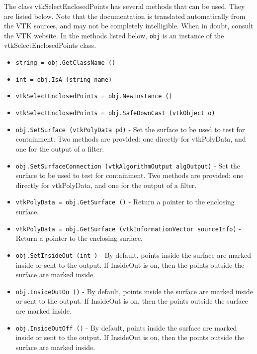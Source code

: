 The class vtkSelectEnclosedPoints has several methods that can be used.
  They are listed below.
Note that the documentation is translated automatically from the VTK sources,
and may not be completely intelligible.  When in doubt, consult the VTK website.
In the methods listed below, \verb|obj| is an instance of the vtkSelectEnclosedPoints class.
\begin{itemize}
\item  \verb|string = obj.GetClassName ()|

\item  \verb|int = obj.IsA (string name)|

\item  \verb|vtkSelectEnclosedPoints = obj.NewInstance ()|

\item  \verb|vtkSelectEnclosedPoints = obj.SafeDownCast (vtkObject o)|

\item  \verb|obj.SetSurface (vtkPolyData pd)| -  Set the surface to be used to test for containment. Two methods are 
 provided: one directly for vtkPolyData, and one for the output of a
 filter.

\item  \verb|obj.SetSurfaceConnection (vtkAlgorithmOutput algOutput)| -  Set the surface to be used to test for containment. Two methods are 
 provided: one directly for vtkPolyData, and one for the output of a
 filter.

\item  \verb|vtkPolyData = obj.GetSurface ()| -  Return a pointer to the enclosing surface.

\item  \verb|vtkPolyData = obj.GetSurface (vtkInformationVector sourceInfo)| -  Return a pointer to the enclosing surface.

\item  \verb|obj.SetInsideOut (int )| -  By default, points inside the surface are marked inside or sent to
 the output. If InsideOut is on, then the points outside the surface
 are marked inside.

\item  \verb|obj.InsideOutOn ()| -  By default, points inside the surface are marked inside or sent to
 the output. If InsideOut is on, then the points outside the surface
 are marked inside.

\item  \verb|obj.InsideOutOff ()| -  By default, points inside the surface are marked inside or sent to
 the output. If InsideOut is on, then the points outside the surface
 are marked inside.


\end{itemize}
